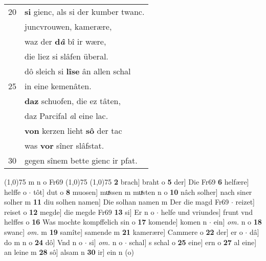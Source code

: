 \documentclass[8pt,a4paper,notitlepage]{article}
\begin{document}
\begin{table}[ht]
\begin{minipage}[t]{0.5\linewidth}
\begin{tabular}{rl}
20 & \textbf{si} gienc, als si der kumber twanc.\\ 
 & juncvrouwen, kamerære,\\ 
 & waz der \textbf{d\textit{â}} bî ir wære,\\ 
 & die liez si slâfen überal.\\ 
 & dô sleich si \textbf{lîse} ân allen schal\\ 
25 & in eine kemenâten.\\ 
 & \textbf{daz} schuofen, die ez tâten,\\ 
 & daz Parcifal \textit{a}l eine lac.\\ 
 & \textbf{von} kerzen lieht \textbf{sô} der tac\\ 
 & was \textbf{vor} sîner slâfstat.\\ 
30 & gegen sînem bette gienc ir pfat.\\ 
\end{tabular}
\scriptsize
\line(1,0){75} \newline
m n o Fr69 \newline
\line(1,0){75} \newline
\newline
\line(1,0){75} \newline
\textbf{2} brach] braht o \textbf{5} der] Die Fr69 \textbf{6} helfære] helffe o  $\cdot$ tôt] dut o \textbf{8} muosen] muͯssen m muͯsten n o \textbf{10} nâch solher] nach siner solher m \textbf{11} diu solhen namen] Die solhan namen m Der die magd Fr69  $\cdot$ reizet] reiset o \textbf{12} megde] die megde Fr69 \textbf{13} si] Er n o  $\cdot$ helfe und vriundes] frunt vnd helffes o \textbf{16} Was mochte kompffelich sin o \textbf{17} komende] komen n  $\cdot$ ein] \textit{om.} n o \textbf{18} swanc] \textit{om.} m \textbf{19} samîte] samende m \textbf{21} kamerære] Cammere o \textbf{22} der] er o  $\cdot$ dâ] do m n o \textbf{24} dô] Vnd n o  $\cdot$ si] \textit{om.} n o  $\cdot$ schal] s schal o \textbf{25} eine] ern o \textbf{27} al eine] an leine m \textbf{28} sô] alsam n \textbf{30} ir] ein n (o) \newline
\end{minipage}
\end{table}
\newpage
\end{document}
